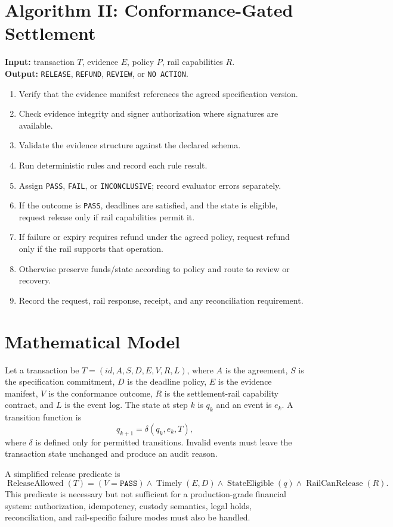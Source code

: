 \documentclass[12pt,a4paper,oneside]{report}
\begin{document}
\section{Algorithm II: Conformance-Gated Settlement}
\textbf{Input:} transaction $T$, evidence $E$, policy $P$, rail capabilities $R$.\\
\textbf{Output:} \texttt{RELEASE}, \texttt{REFUND}, \texttt{REVIEW}, or \texttt{NO ACTION}.
\begin{enumerate}[leftmargin=*]
\item Verify that the evidence manifest references the agreed specification version.
\item Check evidence integrity and signer authorization where signatures are available.
\item Validate the evidence structure against the declared schema.
\item Run deterministic rules and record each rule result.
\item Assign \texttt{PASS}, \texttt{FAIL}, or \texttt{INCONCLUSIVE}; record evaluator errors separately.
\item If the outcome is \texttt{PASS}, deadlines are satisfied, and the state is eligible, request release only if rail capabilities permit it.
\item If failure or expiry requires refund under the agreed policy, request refund only if the rail supports that operation.
\item Otherwise preserve funds/state according to policy and route to review or recovery.
\item Record the request, rail response, receipt, and any reconciliation requirement.
\end{enumerate}

\section{Mathematical Model}
Let a transaction be $T=(id,A,S,D,E,V,R,L)$, where $A$ is the agreement, $S$ is the specification commitment, $D$ is the deadline policy, $E$ is the evidence manifest, $V$ is the conformance outcome, $R$ is the settlement-rail capability contract, and $L$ is the event log. The state at step $k$ is $q_k$ and an event is $e_k$. A transition function is
\[
q_{k+1}=\delta(q_k,e_k,T),
\]
where $\delta$ is defined only for permitted transitions. Invalid events must leave the transaction state unchanged and produce an audit reason.

A simplified release predicate is
\[
\operatorname{ReleaseAllowed}(T)=
(V=\texttt{PASS})\land \operatorname{Timely}(E,D)
\land \operatorname{StateEligible}(q)
\land \operatorname{RailCanRelease}(R).
\]
This predicate is necessary but not sufficient for a production-grade financial system: authorization, idempotency, custody semantics, legal holds, reconciliation, and rail-specific failure modes must also be handled.
\end{document}
